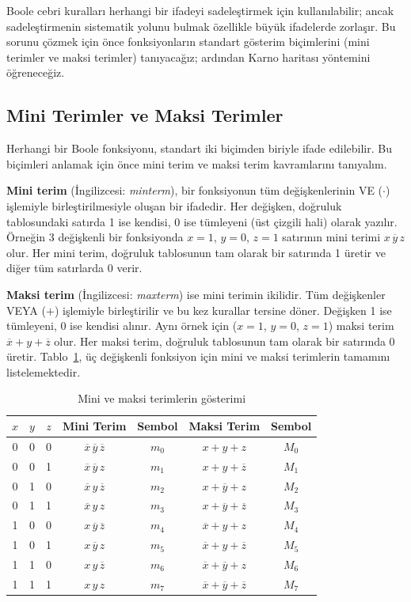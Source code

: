 Boole cebri kuralları herhangi bir ifadeyi sadeleştirmek için kullanılabilir; ancak sadeleştirmenin sistematik yolunu bulmak özellikle büyük ifadelerde zorlaşır. Bu sorunu çözmek için önce fonksiyonların standart gösterim biçimlerini (mini terimler ve maksi terimler) tanıyacağız; ardından Karno haritası yöntemini öğreneceğiz.

\subsection{Mini Terimler ve Maksi Terimler}

Herhangi bir Boole fonksiyonu, standart iki biçimden biriyle ifade edilebilir. Bu biçimleri anlamak için önce mini terim ve maksi terim kavramlarını tanıyalım.

\textbf{Mini terim} (İngilizcesi: \textit{minterm}), bir fonksiyonun tüm değişkenlerinin VE ($\cdot$) işlemiyle birleştirilmesiyle oluşan bir ifadedir. Her değişken, doğruluk tablosundaki satırda 1 ise kendisi, 0 ise tümleyeni (üst çizgili hali) olarak yazılır. Örneğin 3 değişkenli bir fonksiyonda $x=1$, $y=0$, $z=1$ satırının mini terimi $x\,\overline{y}\,z$ olur. Her mini terim, doğruluk tablosunun tam olarak bir satırında 1 üretir ve diğer tüm satırlarda 0 verir.

\textbf{Maksi terim} (İngilizcesi: \textit{maxterm}) ise mini terimin ikilidir. Tüm değişkenler VEYA ($+$) işlemiyle birleştirilir ve bu kez kurallar tersine döner. Değişken 1 ise tümleyeni, 0 ise kendisi alınır. Aynı örnek için ($x=1$, $y=0$, $z=1$) maksi terim $\overline{x}+y+\overline{z}$ olur. Her maksi terim, doğruluk tablosunun tam olarak bir satırında 0 üretir. Tablo~\ref{tab:B.4}, üç değişkenli fonksiyon için mini ve maksi terimlerin tamamını listelemektedir.

\begin{table}[H]
\centering
\caption{Mini ve maksi terimlerin gösterimi}
\label{tab:B.4}
\begin{tabular}{ccc|cc|cc}
\toprule
$x$ & $y$ & $z$ & \textbf{Mini Terim} & \textbf{Sembol} & \textbf{Maksi Terim} & \textbf{Sembol} \\
\midrule
0 & 0 & 0 & $\overline{x}\,\overline{y}\,\overline{z}$ & $m_0$ & $x+y+z$ & $M_0$ \\
0 & 0 & 1 & $\overline{x}\,\overline{y}\,z$ & $m_1$ & $x+y+\overline{z}$ & $M_1$ \\
0 & 1 & 0 & $\overline{x}\,y\,\overline{z}$ & $m_2$ & $x+\overline{y}+z$ & $M_2$ \\
0 & 1 & 1 & $\overline{x}\,y\,z$ & $m_3$ & $x+\overline{y}+\overline{z}$ & $M_3$ \\
1 & 0 & 0 & $x\,\overline{y}\,\overline{z}$ & $m_4$ & $\overline{x}+y+z$ & $M_4$ \\
1 & 0 & 1 & $x\,\overline{y}\,z$ & $m_5$ & $\overline{x}+y+\overline{z}$ & $M_5$ \\
1 & 1 & 0 & $x\,y\,\overline{z}$ & $m_6$ & $\overline{x}+\overline{y}+z$ & $M_6$ \\
1 & 1 & 1 & $x\,y\,z$ & $m_7$ & $\overline{x}+\overline{y}+\overline{z}$ & $M_7$ \\
\bottomrule
\end{tabular}
\end{table}


